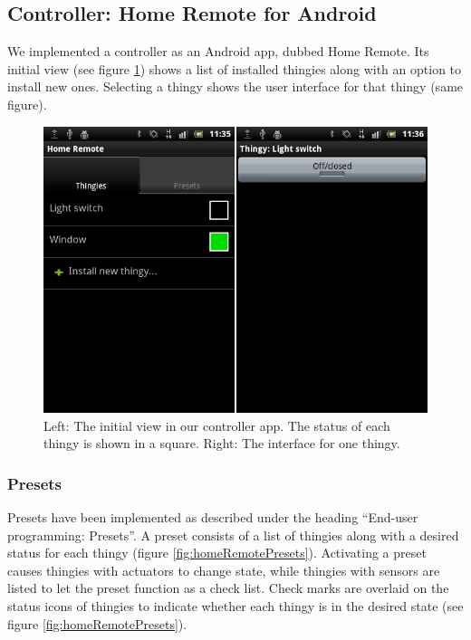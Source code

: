 \documentclass{ubicomp2012}
\begin{document}
\subsection{Controller: Home Remote for Android}

We implemented a controller as an Android app, dubbed Home Remote. Its initial view (see figure \ref{fig:homeRemoteHomeView}) shows a list of installed thingies along with an option to install new ones. Selecting a thingy shows the user interface for that thingy (same figure).

\begin{figure}[th]
\begin{center}
\includegraphics[width=0.90\columnwidth]{figures/home-remote-thingies+1.png}
\end{center}
\caption{Left: The initial view in our controller app. The status of each thingy is shown in a square. Right: The interface for one thingy.}
\label{fig:homeRemoteHomeView}
\end{figure}

\subsubsection{Presets}

Presets have been implemented as described under the heading ``End-user programming: Presets''. A preset consists of a list of thingies along with a desired status for each thingy (figure \ref{fig:homeRemotePresets}). Activating a preset causes thingies with actuators to change state, while thingies with sensors are listed to let the preset function as a check list. Check marks are overlaid on the status icons of thingies to indicate whether each thingy is in the desired state (see figure \ref{fig:homeRemotePresets}).
\end{document}
